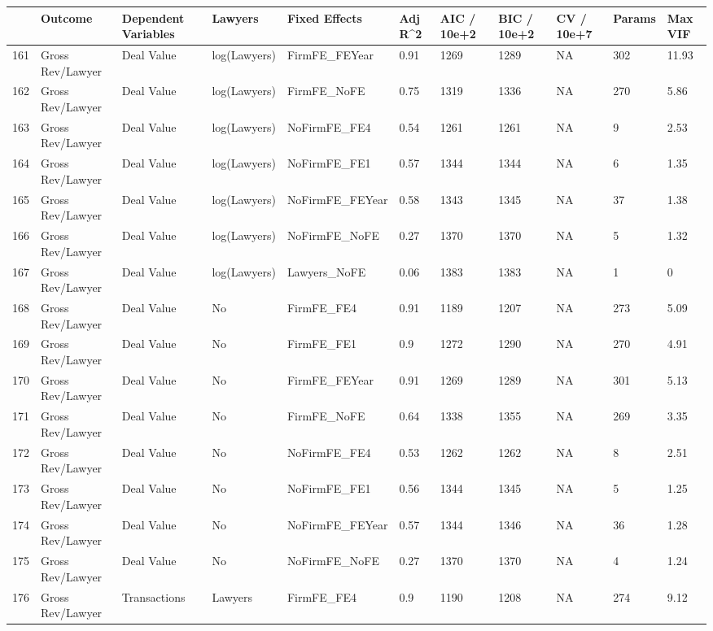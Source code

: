 \documentclass{article}
\begin{document}
\begin{table}[H]
\centering
\begin{tabular}{rllllllllll}
  \hline
 & Outcome & Dependent Variables & Lawyers & Fixed Effects & Adj R^2 & AIC / 10e+2 & BIC / 10e+2 & CV / 10e+7 & Params & Max VIF \\
  \hline
161 & Gross Rev/Lawyer & Deal Value & log(Lawyers) & FirmFE\_FEYear & 0.91 & 1269 & 1289 & NA & 302 & 11.93 \\
  162 & Gross Rev/Lawyer & Deal Value & log(Lawyers) & FirmFE\_NoFE & 0.75 & 1319 & 1336 & NA & 270 & 5.86 \\
  163 & Gross Rev/Lawyer & Deal Value & log(Lawyers) & NoFirmFE\_FE4 & 0.54 & 1261 & 1261 & NA & 9 & 2.53 \\
  164 & Gross Rev/Lawyer & Deal Value & log(Lawyers) & NoFirmFE\_FE1 & 0.57 & 1344 & 1344 & NA & 6 & 1.35 \\
  165 & Gross Rev/Lawyer & Deal Value & log(Lawyers) & NoFirmFE\_FEYear & 0.58 & 1343 & 1345 & NA & 37 & 1.38 \\
  166 & Gross Rev/Lawyer & Deal Value & log(Lawyers) & NoFirmFE\_NoFE & 0.27 & 1370 & 1370 & NA & 5 & 1.32 \\
  167 & Gross Rev/Lawyer & Deal Value & log(Lawyers) & Lawyers\_NoFE & 0.06 & 1383 & 1383 & NA & 1 & 0 \\
  168 & Gross Rev/Lawyer & Deal Value & No & FirmFE\_FE4 & 0.91 & 1189 & 1207 & NA & 273 & 5.09 \\
  169 & Gross Rev/Lawyer & Deal Value & No & FirmFE\_FE1 & 0.9 & 1272 & 1290 & NA & 270 & 4.91 \\
  170 & Gross Rev/Lawyer & Deal Value & No & FirmFE\_FEYear & 0.91 & 1269 & 1289 & NA & 301 & 5.13 \\
  171 & Gross Rev/Lawyer & Deal Value & No & FirmFE\_NoFE & 0.64 & 1338 & 1355 & NA & 269 & 3.35 \\
  172 & Gross Rev/Lawyer & Deal Value & No & NoFirmFE\_FE4 & 0.53 & 1262 & 1262 & NA & 8 & 2.51 \\
  173 & Gross Rev/Lawyer & Deal Value & No & NoFirmFE\_FE1 & 0.56 & 1344 & 1345 & NA & 5 & 1.25 \\
  174 & Gross Rev/Lawyer & Deal Value & No & NoFirmFE\_FEYear & 0.57 & 1344 & 1346 & NA & 36 & 1.28 \\
  175 & Gross Rev/Lawyer & Deal Value & No & NoFirmFE\_NoFE & 0.27 & 1370 & 1370 & NA & 4 & 1.24 \\
  176 & Gross Rev/Lawyer & Transactions & Lawyers & FirmFE\_FE4 & 0.9 & 1190 & 1208 & NA & 274 & 9.12 \\

\end{tabular}
\end{table}
\end{document}
